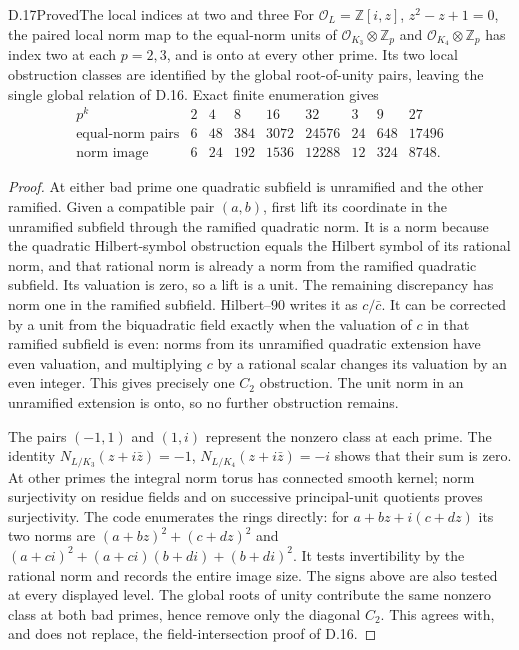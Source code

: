 \begin{statement}{D.17}{Proved}{The local indices at two and three}
For $\mathcal O_L=\mathbb Z[i,z]$, $z^2-z+1=0$, the paired local norm map to the equal-norm units of $\mathcal O_{K_3}\otimes\mathbb Z_p$ and $\mathcal O_{K_4}\otimes\mathbb Z_p$ has index two at each $p=2,3$, and is onto at every other prime. Its two local obstruction classes are identified by the global root-of-unity pairs, leaving the single global relation of D.16. Exact finite enumeration gives
\[
\begin{array}{c|rrrrrrrr}
 p^k&2&4&8&16&32&3&9&27\\\hline
 \text{equal-norm pairs}&6&48&384&3072&24576&24&648&17496\\
 \text{norm image}&6&24&192&1536&12288&12&324&8748.
\end{array}                                               \tag{D.15}
\]
\end{statement}
\begin{proof}
At either bad prime one quadratic subfield is unramified and the other ramified. Given a compatible pair $(a,b)$, first lift its coordinate in the unramified subfield through the ramified quadratic norm. It is a norm because the quadratic Hilbert-symbol obstruction equals the Hilbert symbol of its rational norm, and that rational norm is already a norm from the ramified quadratic subfield. Its valuation is zero, so a lift is a unit. The remaining discrepancy has norm one in the ramified subfield. Hilbert--90 writes it as $c/\bar c$. It can be corrected by a unit from the biquadratic field exactly when the valuation of $c$ in that ramified subfield is even: norms from its unramified quadratic extension have even valuation, and multiplying $c$ by a rational scalar changes its valuation by an even integer. This gives precisely one $C_2$ obstruction. The unit norm in an unramified extension is onto, so no further obstruction remains.

The pairs $(-1,1)$ and $(1,i)$ represent the nonzero class at each prime. The identity
$N_{L/K_3}(z+i\bar z)=-1$, $N_{L/K_4}(z+i\bar z)=-i$
shows that their sum is zero. At other primes the integral norm torus has connected smooth kernel; norm surjectivity on residue fields and on successive principal-unit quotients proves surjectivity. The code enumerates the rings directly: for $a+bz+i(c+dz)$ its two norms are
$(a+bz)^2+(c+dz)^2$ and
$(a+ci)^2+(a+ci)(b+di)+(b+di)^2$.
It tests invertibility by the rational norm and records the entire image size. The signs above are also tested at every displayed level. The global roots of unity contribute the same nonzero class at both bad primes, hence remove only the diagonal $C_2$. This agrees with, and does not replace, the field-intersection proof of D.16.
\end{proof}

